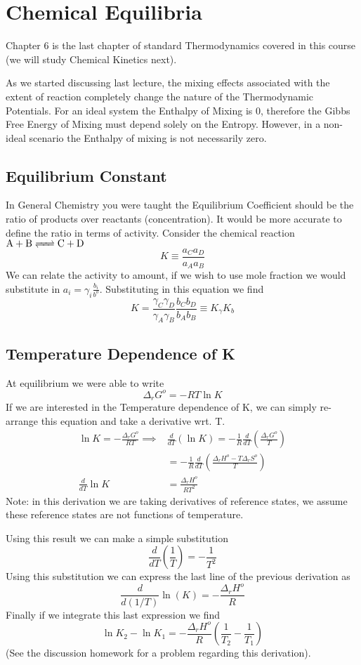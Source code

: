 \documentclass{article}
\newcommand{\be}{\begin{equation}}
\newcommand{\ee}{\end{equation}}
\begin{document}
\section*{Chemical Equilibria}
Chapter 6 is the last chapter of standard Thermodynamics covered in this course (we will study Chemical Kinetics next). 

As we started discussing last lecture, the mixing effects associated with the extent of reaction completely change the nature of the Thermodynamic Potentials. 
For an ideal system the Enthalpy of Mixing is 0, therefore the Gibbs Free Energy of Mixing must depend solely on the Entropy. 
However, in a non-ideal scenario the Enthalpy of mixing is not necessarily zero. 

\subsection*{Equilibrium Constant}
In General Chemistry you were taught the Equilibrium Coefficient should be the ratio of products over reactants (concentration).
It would be more accurate to define the ratio in terms of activity.
Consider the chemical reaction $\ce{A + B <=> C + D}$
\be
K \equiv \frac{a_Ca_D}{a_Aa_B}
\ee
We can relate the activity to amount, if we wish to use mole fraction we would substitute in $a_i = \gamma_i \frac{b_i}{b^o}$. 
Substituting in this equation we find
\be
K = \frac{\gamma_C\gamma_D}{\gamma_A\gamma_B}\frac{b_Cb_D}{b_Ab_B} \equiv K_\gamma K_b
\ee

\subsection*{Temperature Dependence of K}
At equilibrium we were able to write
\be
\Delta_rG^o = -RT\ln K
\ee
If we are interested in the Temperature dependence of K, we can simply re-arrange this equation and take a derivative wrt. T. 
\be
\begin{split}
\ln K = -\frac{\Delta_rG^o}{RT} \implies& \frac{d}{dT}\left(\ln K\right) = -\frac{1}{R} \frac{d}{dT}\left(\frac{\Delta_rG^o}{T}\right)\\
&= -\frac{1}{R} \frac{d}{dT}\left(\frac{\Delta_rH^o - T\Delta_rS^o}{T}\right)\\
\frac{d}{dT} \ln K & = \frac{\Delta_rH^o}{RT^2}
\end{split}
\ee
Note: in this derivation we are taking derivatives of reference states, we assume these reference states are not functions of temperature. 

Using this result we can make a simple substitution
\be
\frac{d}{dT}\left(\frac{1}{T}\right) = -\frac{1}{T^2}
\ee
Using this substitution we can express the last line  of the previous derivation as
\be
\frac{d}{d (1/T)}\ln (K) = -\frac{\Delta_rH^o}{R}
\ee
Finally if we integrate this last expression we find
\be
\ln K_2 - \ln K_1 = -\frac{\Delta_rH^o}{R}\left(\frac{1}{T_2} - \frac{1}{T_1}\right)
\ee
(See the discussion homework for a problem regarding this derivation).
\end{document}
